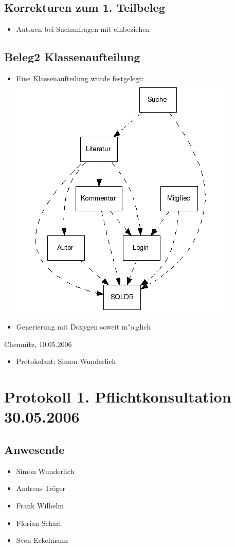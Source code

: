 			\subsection{Korrekturen zum 1. Teilbeleg}
			\begin{itemize}
				\item Autoren bei Suchanfragen mit einbeziehen
			\end{itemize}
			\subsection{Beleg2 Klassenaufteilung}
			\begin{itemize}
					\item Eine Klassenaufteilung wurde festgelegt:
					\includegraphics[scale=0.8]{../protokoll/2006_05_10.png}
					\item Generierung mit Doxygen soweit m"o;glich
			\end{itemize}
			Chemnitz, 10.05.2006
			\begin{itemize}
				\item Protokolant: Simon Wunderlich
			\end{itemize}
\newpage
		\section{Protokoll 1. Pflichtkonsultation 30.05.2006}
		\subsection{Anwesende}
		\begin{itemize}
			\item Simon Wunderlich
			\item Andreas Tröger
			\item Frank Wilhelm
			\item Florian Scharl
			\item Sven Eckelmann
		\end{itemize}
